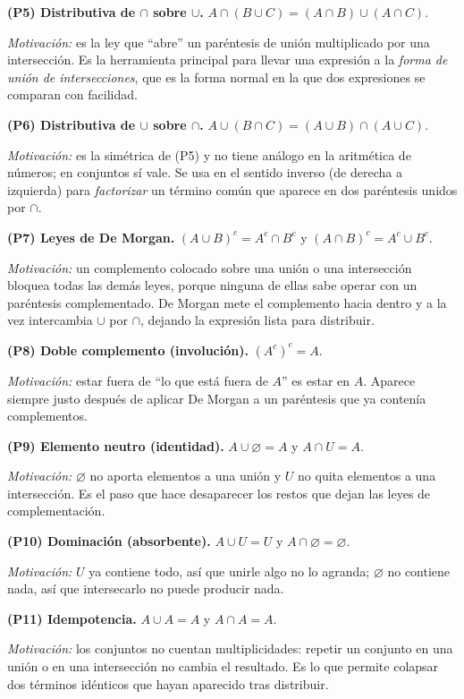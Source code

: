 \documentclass[11pt]{article}
\begin{document}
\begin{teo}
\medskip
\textbf{(P5) Distributiva de $\cap$ sobre $\cup$.}
$A\cap(B\cup C)=(A\cap B)\cup(A\cap C)$.

\emph{Motivación:} es la ley que ``abre'' un paréntesis de unión multiplicado por una
intersección. Es la herramienta principal para llevar una expresión a la \emph{forma de unión
de intersecciones}, que es la forma normal en la que dos expresiones se comparan con facilidad.

\medskip
\textbf{(P6) Distributiva de $\cup$ sobre $\cap$.}
$A\cup(B\cap C)=(A\cup B)\cap(A\cup C)$.

\emph{Motivación:} es la simétrica de (P5) y no tiene análogo en la aritmética de números; en
conjuntos sí vale. Se usa en el sentido inverso (de derecha a izquierda) para \emph{factorizar}
un término común que aparece en dos paréntesis unidos por $\cap$.

\medskip
\textbf{(P7) Leyes de De Morgan.} $(A\cup B)^{c}=A^{c}\cap B^{c}$ \quad y \quad
$(A\cap B)^{c}=A^{c}\cup B^{c}$.

\emph{Motivación:} un complemento colocado sobre una unión o una intersección bloquea todas las
demás leyes, porque ninguna de ellas sabe operar con un paréntesis complementado. De Morgan
mete el complemento hacia dentro y a la vez intercambia $\cup$ por $\cap$, dejando la expresión
lista para distribuir.

\medskip
\textbf{(P8) Doble complemento (involución).} $(A^{c})^{c}=A$.

\emph{Motivación:} estar fuera de ``lo que está fuera de $A$'' es estar en $A$. Aparece siempre
justo después de aplicar De Morgan a un paréntesis que ya contenía complementos.

\medskip
\textbf{(P9) Elemento neutro (identidad).} $A\cup\varnothing=A$ \quad y \quad $A\cap U=A$.

\emph{Motivación:} $\varnothing$ no aporta elementos a una unión y $U$ no quita elementos a una
intersección. Es el paso que hace desaparecer los restos que dejan las leyes de
complementación.

\medskip
\textbf{(P10) Dominación (absorbente).} $A\cup U=U$ \quad y \quad $A\cap\varnothing=\varnothing$.

\emph{Motivación:} $U$ ya contiene todo, así que unirle algo no lo agranda; $\varnothing$ no
contiene nada, así que intersecarlo no puede producir nada.

\medskip
\textbf{(P11) Idempotencia.} $A\cup A=A$ \quad y \quad $A\cap A=A$.

\emph{Motivación:} los conjuntos no cuentan multiplicidades: repetir un conjunto en una unión o
en una intersección no cambia el resultado. Es lo que permite colapsar dos términos idénticos
que hayan aparecido tras distribuir.


\end{teo}
\end{document}
